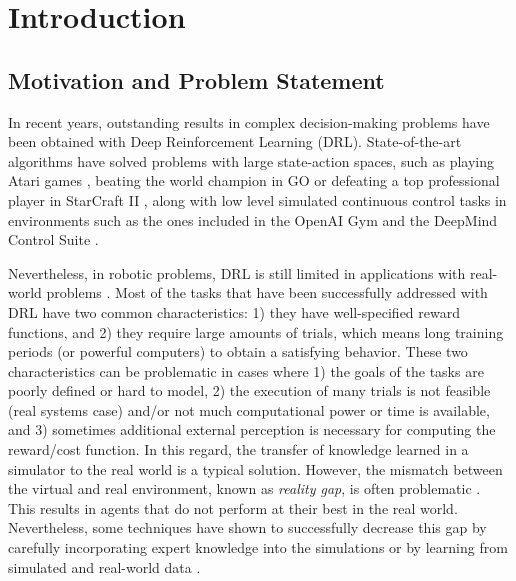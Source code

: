 \chapter{Introduction}
\section{Motivation and Problem Statement}
In  recent years, outstanding results in complex decision-making problems have been obtained with Deep Reinforcement Learning (DRL). State-of-the-art algorithms have solved problems with large state-action spaces, such as playing Atari games \cite{atari}, beating the world champion in GO \cite{Silver2016} or defeating a top professional player in StarCraft II \cite{alphastarblog}, along with low level simulated continuous control tasks in environments such as the ones included in the OpenAI Gym \cite{brockman2016openai} and the DeepMind Control Suite \cite{tassa2018deepmind}. 

Nevertheless, in robotic problems, DRL is still limited in applications with real-world problems \cite{Gu2017}. Most of the tasks that have been successfully addressed with DRL have two common characteristics: 1) they have well-specified reward functions, and 2) they require large amounts of trials, which means long training periods (or powerful computers) to obtain a satisfying behavior. These two characteristics can be problematic in cases where 1) the goals of the tasks are poorly defined or hard to model, 2) the execution of many trials is not feasible (real systems case) and/or not much computational power or time is available, and 3) sometimes additional external perception is necessary for computing the reward/cost function. In this regard, the transfer of knowledge learned in a simulator to the real world is a typical solution. However, the mismatch between the virtual and real environment, known as \emph{reality gap}, is often problematic \cite{koos2013transferability}. This results in agents that do not perform at their best in the real world. Nevertheless, some techniques have shown to successfully decrease this gap by carefully incorporating expert knowledge into the simulations \cite{lobos2018visual, tan2018sim} or by learning from simulated and real-world data \cite{farchy2013humanoid, lee2019robust}.

